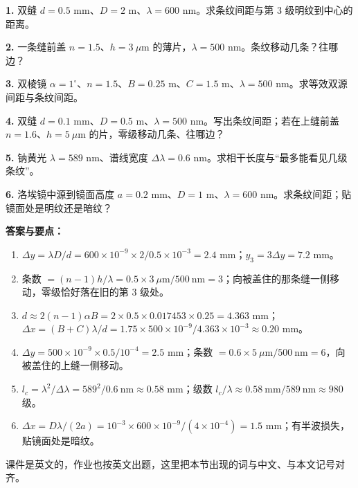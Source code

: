 \documentclass[11pt]{ctexart}
\begin{document}
\flowerrule


\textbf{1.} 双缝 $d=0.5$ mm、$D=2$ m、$\lambda=600$ nm。求条纹间距与第 3 级明纹到中心的距离。

\textbf{2.} 一条缝前盖 $n=1.5$、$h=3\ \mu$m 的薄片，$\lambda=500$ nm。条纹移动几条？往哪边？

\textbf{3.} 双棱镜 $\alpha=1^\circ$、$n=1.5$、$B=0.25$ m、$C=1.5$ m、$\lambda=500$ nm。求等效双源间距与条纹间距。

\textbf{4.} 双缝 $d=0.1$ mm、$D=0.5$ m、$\lambda=500$ nm。写出条纹间距；若在上缝前盖 $n=1.6$、$h=5\ \mu$m 的片，零级移动几条、往哪边？

\textbf{5.} 钠黄光 $\lambda=589$ nm、谱线宽度 $\Delta\lambda=0.6$ nm。求相干长度与“最多能看见几级条纹”。

\textbf{6.} 洛埃镜中源到镜面高度 $a=0.2$ mm、$D=1$ m、$\lambda=600$ nm。求条纹间距；贴镜面处是明纹还是暗纹？

\medskip
\textbf{答案与要点：}
\begin{enumerate}
\item $\Delta y=\lambda D/d=600\times10^{-9}\times2/0.5\times10^{-3}=2.4$ mm；$y_3=3\Delta y=7.2$ mm。
\item 条数 $=(n-1)h/\lambda=0.5\times3\ \mu\mathrm{m}/500\ \mathrm{nm}=3$；向被盖住的那条缝一侧移动，零级恰好落在旧的第 3 级处。
\item $d\approx2(n-1)\alpha B=2\times0.5\times0.017453\times0.25=4.363$ mm；$\Delta x=(B+C)\lambda/d=1.75\times500\times10^{-9}/4.363\times10^{-3}\approx0.20$ mm。
\item $\Delta y=500\times10^{-9}\times0.5/10^{-4}=2.5$ mm；条数 $=0.6\times5\ \mu\mathrm{m}/500\ \mathrm{nm}=6$，向被盖住的上缝一侧移动。
\item $l_c=\lambda^{2}/\Delta\lambda=589^{2}/0.6\ \mathrm{nm}\approx0.58$ mm；级数 $l_c/\lambda\approx0.58\ \mathrm{mm}/589\ \mathrm{nm}\approx980$ 级。
\item $\Delta x=D\lambda/(2a)=10^{-3}\times600\times10^{-9}/(4\times10^{-4})=1.5$ mm；有半波损失，贴镜面处是暗纹。
\end{enumerate}


课件是英文的，作业也按英文出题，这里把本节出现的词与中文、与本文记号对齐。
\end{document}
